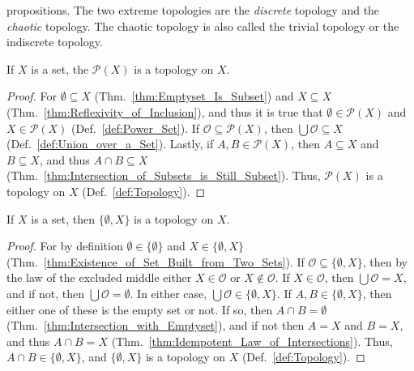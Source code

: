     propositions. The two extreme topologies are the \textit{discrete} topology
    and the \textit{chaotic} topology. The chaotic topology is also called the
    trivial topology or the indiscrete topology.%
    \begin{theorem}
        \label{thm:discrete_topology_is_a_topology}%
        If $X$ is a set, the $\mathcal{P}(X)$ is a topology on $X$.
    \end{theorem}
    \begin{proof}
        For $\emptyset\subseteq{X}$ (Thm.~\ref{thm:Emptyset_Is_Subset}) and
        $X\subseteq{X}$ (Thm.~\ref{thm:Reflexivity_of_Inclusion}), and thus it
        is true that $\emptyset\in\mathcal{P}(X)$ and $X\in\mathcal{P}(X)$
        (Def.~\ref{def:Power_Set}). If $\mathcal{O}\subseteq\mathcal{P}(X)$,
        then $\bigcup\mathcal{O}\subseteq{X}$ (Def.~\ref{def:Union_over_a_Set}).
        Lastly, if $A,B\in\mathcal{P}(X)$, then $A\subseteq{X}$ and
        $B\subseteq{X}$, and thus $A\cap{B}\subseteq{X}$
        (Thm.~\ref{thm:Intersection_of_Subsets_is_Still_Subset}). Thus,
        $\mathcal{P}(X)$ is a topology on $X$ (Def.~\ref{def:Topology}).
    \end{proof}
    \begin{theorem}
        \label{thm:chaotic_topology_is_topology}%
        If $X$ is a set, then $\{\emptyset,X\}$ is a topology on $X$.
    \end{theorem}
    \begin{proof}
        For by definition $\emptyset\in\{\emptyset\}$ and $X\in\{\emptyset,X\}$
        (Thm.~\ref{thm:Existence_of_Set_Built_from_Two_Sets}). If
        $\mathcal{O}\subseteq\{\emptyset,X\}$, then by the law of the excluded
        middle either $X\in\mathcal{O}$ or $X\notin\mathcal{O}$. If
        $X\in\mathcal{O}$, then $\bigcup\mathcal{O}=X$, and if not, then
        $\bigcup\mathcal{O}=\emptyset$. In either case,
        $\bigcup\mathcal{O}\in\{\emptyset,X\}$. If $A,B\in\{\emptyset,X\}$, then
        either one of these is the empty set or not. If so, then
        $A\cap{B}=\emptyset$ (Thm.~\ref{thm:Intersection_with_Emptyset}), and
        if not then $A=X$ and $B=X$, and thus $A\cap{B}=X$
        (Thm.~\ref{thm:Idempotent_Law_of_Intersections}). Thus,
        $A\cap{B}\in\{\emptyset,X\}$, and $\{\emptyset,X\}$ is a topology on $X$
        (Def.~\ref{def:Topology}).
    \end{proof}
